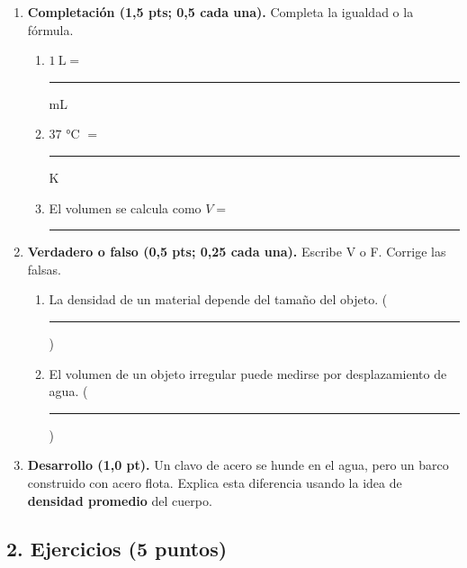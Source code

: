 \documentclass[12pt, letterpaper]{article}
\begin{document}
\begin{enumerate}[leftmargin=*, label=\textbf{\arabic*.}, itemsep=0.5em]
  \item \textbf{Completación (1,5 pts; 0,5 cada una).} Completa la igualdad o la fórmula.
        \begin{enumerate}[label=\alph*), leftmargin=1.8em, itemsep=0.4em]
          \item $1\ \text{L} =$ \rule{2.2cm}{0.4pt} mL
          \item $37$ °C $=$ \rule{2.2cm}{0.4pt} K
          \item El volumen se calcula como $V =$ \rule{2.2cm}{0.4pt}
        \end{enumerate}

  \item \textbf{Verdadero o falso (0,5 pts; 0,25 cada una).} Escribe V o F. Corrige las falsas.
        \begin{enumerate}[label=\alph*), leftmargin=1.8em, itemsep=0.45em]
          \item La densidad de un material depende del tamaño del objeto.
                \hfill (\rule{0.6cm}{0.4pt})
          \item El volumen de un objeto irregular puede medirse por desplazamiento de agua.
                \hfill (\rule{0.6cm}{0.4pt})
        \end{enumerate}

  \item \textbf{Desarrollo (1,0 pt).} Un clavo de acero se hunde en el agua, pero un
        barco construido con acero flota. Explica esta diferencia usando la idea de
        \textbf{densidad promedio} del cuerpo.
        \vspace{2.4cm}
\end{enumerate}

\newpage
\subsection*{2. Ejercicios (5 puntos)}
\end{document}
